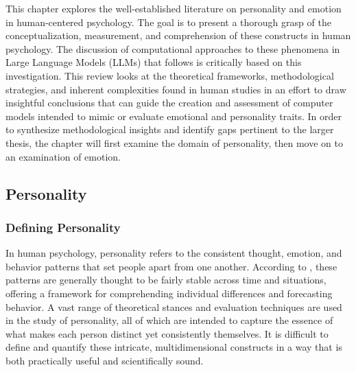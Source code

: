 \documentclass{DESSThesis}
\begin{document}
This chapter explores the well-established literature on personality and emotion in human-centered psychology. The goal is to present a thorough grasp of the conceptualization, measurement, and comprehension of these constructs in human psychology. The discussion of computational approaches to these phenomena in Large Language Models (LLMs) that follows is critically based on this investigation. This review looks at the theoretical frameworks, methodological strategies, and inherent complexities found in human studies in an effort to draw insightful conclusions that can guide the creation and assessment of computer models intended to mimic or evaluate emotional and personality traits. In order to synthesize methodological insights and identify gaps pertinent to the larger thesis, the chapter will first examine the domain of personality, then move on to an examination of emotion.

\subsection{Personality}

\subsubsection{Defining Personality}
In human psychology, personality refers to the consistent thought, emotion, and behavior patterns that set people apart from one another. According to \cite{feng_five-factor_2024,mccrae_reinterpreting_1989}, these patterns are generally thought to be fairly stable across time and situations, offering a framework for comprehending individual differences and forecasting behavior. A vast range of theoretical stances and evaluation techniques are used in the study of personality, all of which are intended to capture the essence of what makes each person distinct yet consistently themselves. It is difficult to define and quantify these intricate, multidimensional constructs in a way that is both practically useful and scientifically sound.
\end{document}
